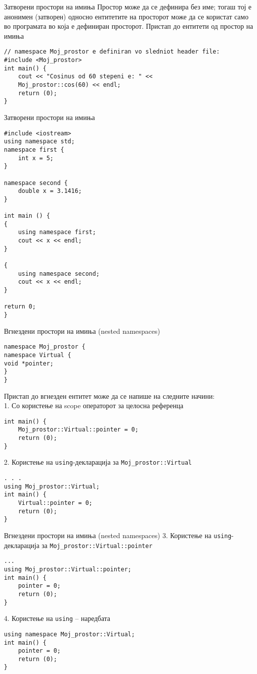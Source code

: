 \begin{frame}[fragile]{Затворени простори на имиња}
Простор може да се дефинира без име; тогаш тој е анонимен (затворен) односно
ентитетите на просторот може да се користат само во програмата во која е
дефиниран просторот.
Пристап до ентитети од простор на имиња
\begin{lstlisting}
// namespace Moj_prostor e definiran vo sledniot header file:
#include <Moj_prostor>
int main() {
    cout << "Cosinus od 60 stepeni e: " <<
    Moj_prostor::cos(60) << endl;
    return (0);
}
\end{lstlisting}
\end{frame}

\begin{frame}[fragile]{Затворени простори на имиња}
\begin{lstlisting}
#include <iostream> 
using namespace std;  
namespace first { 
    int x = 5; 
} 

namespace second { 
    double x = 3.1416; 
} 

int main () { 
{ 
    using namespace first; 
    cout << x << endl; 
} 

{ 
    using namespace second; 
    cout << x << endl; 
} 

return 0; 
}

\end{lstlisting}
\end{frame}

\begin{frame}[fragile]{Вгнездени простори на имиња (nested namespaces)}
\begin{lstlisting}
namespace Moj_prostor {
namespace Virtual {
void *pointer;
}
}
\end{lstlisting}
Пристап до вгнезден ентитет може да се напише на следните начини:\\
1. Со користење на scope операторот за целосна референца
\begin{lstlisting}
int main() {
    Moj_prostor::Virtual::pointer = 0;
    return (0);
}
\end{lstlisting}

2. Користење на \texttt{using}-декларација за \texttt{Moj\_prostor::Virtual}
\begin{lstlisting}
. . .
using Moj_prostor::Virtual;
int main() {
    Virtual::pointer = 0;
    return (0);
}
\end{lstlisting}
\end{frame}

\begin{frame}[fragile]{Вгнездени простори на имиња (nested namespaces)}
3. Користење на \texttt{using}-декларација за \texttt{Moj\_prostor::Virtual::pointer}
\begin{lstlisting}
...
using Moj_prostor::Virtual::pointer;
int main() {
    pointer = 0;
    return (0);
}
\end{lstlisting}
4. Користење на \texttt{using} – наредбата 
\begin{lstlisting}
using namespace Moj_prostor::Virtual;
int main() {
    pointer = 0;
    return (0);
}
\end{lstlisting}
\end{frame}

